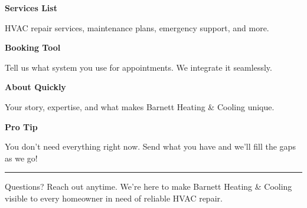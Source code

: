 \documentclass[11pt,letterpaper]{article}
\begin{document}
\hfill
\begin{minipage}[t]{0.48\textwidth}
\begin{tcolorbox}[colframe=accent-teal, boxrule=1pt, left=0.7em, right=0.7em, top=0.5em, bottom=0.5em, arc=4pt, boxsep=0pt]
{\bfseries\small\color{accent-teal}Services List}

\vspace{0.15em}

{\small HVAC repair services, maintenance plans, emergency support, and more.}
\end{tcolorbox}

\vspace{0.1em}

\begin{tcolorbox}[colframe=accent-teal, boxrule=1pt, left=0.7em, right=0.7em, top=0.5em, bottom=0.5em, arc=4pt, boxsep=0pt]
{\bfseries\small\color{accent-teal}Booking Tool}

\vspace{0.15em}

{\small Tell us what system you use for appointments. We integrate it seamlessly.}
\end{tcolorbox}

\vspace{0.1em}

\begin{tcolorbox}[colframe=accent-teal, boxrule=1pt, left=0.7em, right=0.7em, top=0.5em, bottom=0.5em, arc=4pt, boxsep=0pt]
{\bfseries\small\color{accent-teal}About Quickly}

\vspace{0.15em}

{\small Your story, expertise, and what makes Barnett Heating \& Cooling unique.}
\end{tcolorbox}

\vspace{-0.2em}
\end{minipage}

\vspace{0.15em}

\begin{tcolorbox}[colback={accent-red!5}, colframe=accent-red!20, boxrule=0.5pt, left=0.7em, right=0.7em, top=0.4em, bottom=0.4em, arc=6pt, boxsep=0pt]

{\bfseries\small\color{accent-red}Pro Tip}

\vspace{0.1em}

{\small You don't need everything right now. Send what you have and we'll fill the gaps as we go!}

\end{tcolorbox}

\vspace{0.15em}

\noindent\hrule
\vspace{0.2em}

{\small\color{text-light}Questions? Reach out anytime. We're here to make Barnett Heating \& Cooling visible to every homeowner in need of reliable HVAC repair.}
\end{document}
